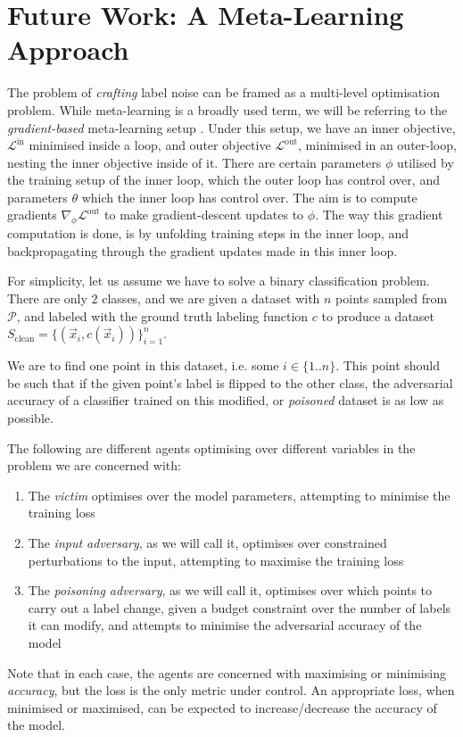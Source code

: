 \documentclass[12pt, oneside]{book}
\begin{document}
\chapter{Future Work: A Meta-Learning Approach}
The problem of \emph{crafting} label noise can be framed as a multi-level
optimisation problem. While meta-learning is a broadly used term, we will be
referring to the \emph{gradient-based} meta-learning setup
\citep{maml,first-order-meta,forward-reverse-hyperparameter}. Under this setup,
we have an inner objective, $\mathcal{L}^\text{in}$ minimised inside a loop, and
outer objective $\mathcal{L}^\text{out}$, minimised in an outer-loop, nesting
the inner objective inside of it. There are certain parameters $\phi$ utilised
by the training setup of the inner loop, which the outer loop has control over,
and parameters $\theta$ which the inner loop has control over. The aim is to
compute gradients $\nabla_\phi \mathcal{L}^\text{out}$ to make gradient-descent
updates to $\phi$. The way this gradient computation is done, is by unfolding
training steps in the inner loop, and backpropagating through the gradient
updates made in this inner loop.

For simplicity, let us assume we have to solve a binary classification problem.
There are only $2$ classes, and we are given a dataset with $n$ points sampled
from $\mathcal{P}$, and labeled with the ground truth labeling function $c$ to
produce a dataset $S_{\text{clean}}=\{(\vec{x}_i, c(\vec{x}_i))\}_{i=1}^n$. 

We are to find one point in this dataset, i.e. some $i \in \{1..n\}$. This point
should be such that if the given point's label is flipped to the other class,
the adversarial accuracy of a classifier trained on this modified, or
\emph{poisoned} dataset is as low as possible.

The following are different agents optimising over different variables in the
problem we are concerned with:
\begin{enumerate}
    \item The \emph{victim} optimises over the model parameters, attempting to
    minimise the training loss
    \item The \emph{input adversary}, as we will call it, optimises over
    constrained perturbations to the input, attempting to maximise the training
    loss
    \item The \emph{poisoning adversary}, as we will call it, optimises over
    which points to carry out a label change, given a budget constraint over the
    number of labels it can modify, and attempts to minimise the adversarial
    accuracy of the model
\end{enumerate}
Note that in each case, the agents are concerned with maximising or minimising
\emph{accuracy}, but the loss is the only metric under control. An appropriate
loss, when minimised or maximised, can be expected to increase/decrease the
accuracy of the model.
\end{document}
